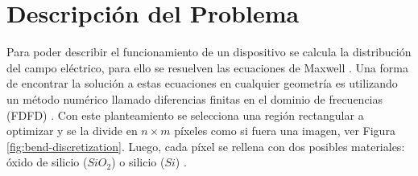 


\section{Descripción del Problema}


Para poder describir el funcionamiento de un dispositivo se calcula la distribución del campo eléctrico, para ello se resuelven las ecuaciones
de Maxwell \citep{Schneider2019}. 
Una forma de encontrar la solución a estas ecuaciones en cualquier geometría es utilizando un método numérico llamado diferencias finitas en el dominio de frecuencias (FDFD) \citep{Su2020}.
Con este planteamiento se selecciona una región rectangular a optimizar y se la divide  en $n \times m$  píxeles como si fuera una imagen, ver Figura \ref{fig:bend-discretization}. 
Luego, cada píxel se rellena con dos posibles materiales: óxido de silicio ($SiO_2$) o silicio ($Si$) \citep{Molesky2018}.

